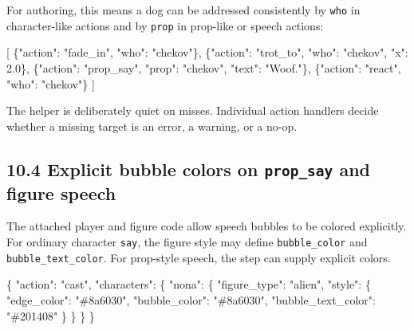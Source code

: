 \documentclass[
  12pt,
  letterpaper,
]{book}
\newenvironment{Shaded}{}{}
\newcommand{\DataTypeTok}[1]{\textcolor[rgb]{0.56,0.13,0.00}{#1}}
\newcommand{\FloatTok}[1]{\textcolor[rgb]{0.25,0.63,0.44}{#1}}
\newcommand{\FunctionTok}[1]{\textcolor[rgb]{0.02,0.16,0.49}{#1}}
\newcommand{\OtherTok}[1]{\textcolor[rgb]{0.00,0.44,0.13}{#1}}
\newcommand{\StringTok}[1]{\textcolor[rgb]{0.25,0.44,0.63}{#1}}
\begin{document}
For authoring, this means a dog can be addressed consistently by
\texttt{who} in character-like actions and by \texttt{prop} in prop-like
or speech actions:

\begin{Shaded}
\begin{Highlighting}[]
\OtherTok{[}
  \FunctionTok{\{}\DataTypeTok{"action"}\FunctionTok{:} \StringTok{"fade\_in"}\FunctionTok{,}  \DataTypeTok{"who"}\FunctionTok{:} \StringTok{"chekov"}\FunctionTok{\}}\OtherTok{,}
  \FunctionTok{\{}\DataTypeTok{"action"}\FunctionTok{:} \StringTok{"trot\_to"}\FunctionTok{,}  \DataTypeTok{"who"}\FunctionTok{:} \StringTok{"chekov"}\FunctionTok{,} \DataTypeTok{"x"}\FunctionTok{:} \FloatTok{2.0}\FunctionTok{\}}\OtherTok{,}
  \FunctionTok{\{}\DataTypeTok{"action"}\FunctionTok{:} \StringTok{"prop\_say"}\FunctionTok{,} \DataTypeTok{"prop"}\FunctionTok{:} \StringTok{"chekov"}\FunctionTok{,} \DataTypeTok{"text"}\FunctionTok{:} \StringTok{"Woof."}\FunctionTok{\}}\OtherTok{,}
  \FunctionTok{\{}\DataTypeTok{"action"}\FunctionTok{:} \StringTok{"react"}\FunctionTok{,}    \DataTypeTok{"who"}\FunctionTok{:} \StringTok{"chekov"}\FunctionTok{\}}
\OtherTok{]}
\end{Highlighting}
\end{Shaded}

The helper is deliberately quiet on misses. Individual action handlers
decide whether a missing target is an error, a warning, or a no-op.

\subsection{\texorpdfstring{10.4 Explicit bubble colors on
\texttt{prop\_say} and figure
speech}{10.4 Explicit bubble colors on prop\_say and figure speech}}\label{explicit-bubble-colors-on-prop_say-and-figure-speech}

The attached player and figure code allow speech bubbles to be colored
explicitly. For ordinary character \texttt{say}, the figure style may
define \texttt{bubble\_color} and \texttt{bubble\_text\_color}. For
prop-style speech, the step can supply explicit colors.

\begin{Shaded}
\begin{Highlighting}[]
\FunctionTok{\{}
  \DataTypeTok{"action"}\FunctionTok{:} \StringTok{"cast"}\FunctionTok{,}
  \DataTypeTok{"characters"}\FunctionTok{:} \FunctionTok{\{}
    \DataTypeTok{"nona"}\FunctionTok{:} \FunctionTok{\{}
      \DataTypeTok{"figure\_type"}\FunctionTok{:} \StringTok{"alien"}\FunctionTok{,}
      \DataTypeTok{"style"}\FunctionTok{:} \FunctionTok{\{}
        \DataTypeTok{"edge\_color"}\FunctionTok{:} \StringTok{"\#8a6030"}\FunctionTok{,}
        \DataTypeTok{"bubble\_color"}\FunctionTok{:} \StringTok{"\#8a6030"}\FunctionTok{,}
        \DataTypeTok{"bubble\_text\_color"}\FunctionTok{:} \StringTok{"\#201408"}
      \FunctionTok{\}}
    \FunctionTok{\}}
  \FunctionTok{\}}
\FunctionTok{\}}
\end{Highlighting}
\end{Shaded}
\end{document}

